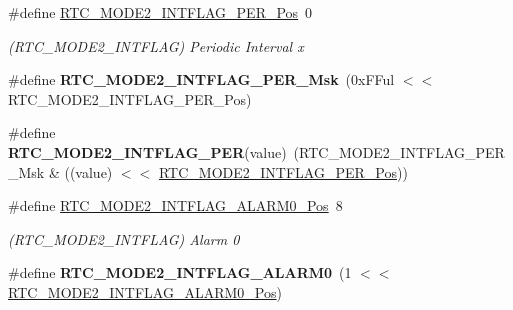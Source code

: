\begin{DoxyCompactItemize}
\item 
\hypertarget{group___s_a_m_l21___r_t_c_ga58d50001ba67191224d40437f82ff8a6}{}\#define \hyperlink{group___s_a_m_l21___r_t_c_ga58d50001ba67191224d40437f82ff8a6}{R\+T\+C\+\_\+\+M\+O\+D\+E2\+\_\+\+I\+N\+T\+F\+L\+A\+G\+\_\+\+P\+E\+R\+\_\+\+Pos}~0\label{group___s_a_m_l21___r_t_c_ga58d50001ba67191224d40437f82ff8a6}

\begin{DoxyCompactList}\small\item\em (R\+T\+C\+\_\+\+M\+O\+D\+E2\+\_\+\+I\+N\+T\+F\+L\+A\+G) Periodic Interval x \end{DoxyCompactList}\item 
\hypertarget{group___s_a_m_l21___r_t_c_gafa8c79ffe5441b4856f54da0a8826f44}{}\#define {\bfseries R\+T\+C\+\_\+\+M\+O\+D\+E2\+\_\+\+I\+N\+T\+F\+L\+A\+G\+\_\+\+P\+E\+R\+\_\+\+Msk}~(0x\+F\+Ful $<$$<$ R\+T\+C\+\_\+\+M\+O\+D\+E2\+\_\+\+I\+N\+T\+F\+L\+A\+G\+\_\+\+P\+E\+R\+\_\+\+Pos)\label{group___s_a_m_l21___r_t_c_gafa8c79ffe5441b4856f54da0a8826f44}

\item 
\hypertarget{group___s_a_m_l21___r_t_c_gaf639ef432b1bb1f6a1905410aa3d1f69}{}\#define {\bfseries R\+T\+C\+\_\+\+M\+O\+D\+E2\+\_\+\+I\+N\+T\+F\+L\+A\+G\+\_\+\+P\+E\+R}(value)~(R\+T\+C\+\_\+\+M\+O\+D\+E2\+\_\+\+I\+N\+T\+F\+L\+A\+G\+\_\+\+P\+E\+R\+\_\+\+Msk \& ((value) $<$$<$ \hyperlink{group___s_a_m_l21___r_t_c_ga58d50001ba67191224d40437f82ff8a6}{R\+T\+C\+\_\+\+M\+O\+D\+E2\+\_\+\+I\+N\+T\+F\+L\+A\+G\+\_\+\+P\+E\+R\+\_\+\+Pos}))\label{group___s_a_m_l21___r_t_c_gaf639ef432b1bb1f6a1905410aa3d1f69}

\item 
\hypertarget{group___s_a_m_l21___r_t_c_ga19defc40b861e590c1c42b75a5210ea7}{}\#define \hyperlink{group___s_a_m_l21___r_t_c_ga19defc40b861e590c1c42b75a5210ea7}{R\+T\+C\+\_\+\+M\+O\+D\+E2\+\_\+\+I\+N\+T\+F\+L\+A\+G\+\_\+\+A\+L\+A\+R\+M0\+\_\+\+Pos}~8\label{group___s_a_m_l21___r_t_c_ga19defc40b861e590c1c42b75a5210ea7}

\begin{DoxyCompactList}\small\item\em (R\+T\+C\+\_\+\+M\+O\+D\+E2\+\_\+\+I\+N\+T\+F\+L\+A\+G) Alarm 0 \end{DoxyCompactList}\item 
\hypertarget{group___s_a_m_l21___r_t_c_ga576feb0e7f6470790f06bd8056eaa24d}{}\#define {\bfseries R\+T\+C\+\_\+\+M\+O\+D\+E2\+\_\+\+I\+N\+T\+F\+L\+A\+G\+\_\+\+A\+L\+A\+R\+M0}~(1 $<$$<$ \hyperlink{group___s_a_m_l21___r_t_c_ga19defc40b861e590c1c42b75a5210ea7}{R\+T\+C\+\_\+\+M\+O\+D\+E2\+\_\+\+I\+N\+T\+F\+L\+A\+G\+\_\+\+A\+L\+A\+R\+M0\+\_\+\+Pos})\label{group___s_a_m_l21___r_t_c_ga576feb0e7f6470790f06bd8056eaa24d}


\end{DoxyCompactItemize}
